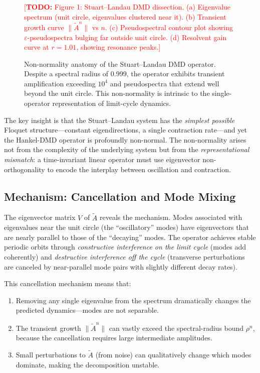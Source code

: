 \documentclass[12pt]{article}
\newcommand{\norm}[1]{\lVert #1 \rVert}
\newcommand{\Atilde}{\tilde{A}}
\newcommand{\todo}[1]{\textcolor{red}{[\textbf{TODO:} #1]}}
\begin{document}
\begin{figure}[t]
  \centering
  \todo{Figure 1: Stuart--Landau DMD dissection.
  (a) Eigenvalue spectrum (unit circle, eigenvalues clustered near it).
  (b) Transient growth curve $\norm{\Atilde^n}$ vs $n$.
  (c) Pseudospectral contour plot showing $\varepsilon$-pseudospectra
      bulging far outside unit circle.
  (d) Resolvent gain curve at $r=1.01$, showing resonance peaks.}
  \caption{Non-normality anatomy of the Stuart--Landau DMD operator.
  Despite a spectral radius of 0.999, the operator exhibits transient
  amplification exceeding $10^4$ and pseudospectra that extend well
  beyond the unit circle. This non-normality is intrinsic to the
  single-operator representation of limit-cycle dynamics.}
  \label{fig:sl_anatomy}
\end{figure}

The key insight is that the Stuart--Landau system has the \emph{simplest
possible} Floquet structure---constant eigendirections, a single contraction
rate---and yet the Hankel-DMD operator is profoundly non-normal. The
non-normality arises not from the complexity of the underlying system but
from the \emph{representational mismatch}: a time-invariant linear operator
must use eigenvector non-orthogonality to encode the interplay between
oscillation and contraction.

\subsection{Mechanism: Cancellation and Mode Mixing}

The eigenvector matrix $V$ of $\Atilde$ reveals the mechanism. Modes
associated with eigenvalues near the unit circle (the ``oscillatory'' modes)
have eigenvectors that are nearly parallel to those of the ``decaying'' modes.
The operator achieves stable periodic orbits through \emph{constructive
interference on the limit cycle} (modes add coherently) and
\emph{destructive interference off the cycle} (transverse perturbations are
canceled by near-parallel mode pairs with slightly different decay rates).

This cancellation mechanism means that:
\begin{enumerate}
  \item Removing any single eigenvalue from the spectrum dramatically
  changes the predicted dynamics---modes are not separable.
  \item The transient growth $\norm{\Atilde^n}$ can vastly exceed the
  spectral-radius bound $\rho^n$, because the cancellation requires
  large intermediate amplitudes.
  \item Small perturbations to $\Atilde$ (from noise) can qualitatively
  change which modes dominate, making the decomposition unstable.
\end{enumerate}
\end{document}
